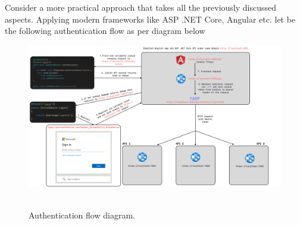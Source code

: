 Consider a more practical approach that takes all the previously discussed aspects.
Applying modern frameworks like ASP .NET Core, Angular etc.
let be the following authentication flow as per diagram below
\begin{figure}[H]
    \centering
    \includegraphics[width=1\textwidth]{img/Auth_flow_updated}
    ~\caption{Authentication flow diagram.}\label{fig:authentication_flow_diagram}
\end{figure}

